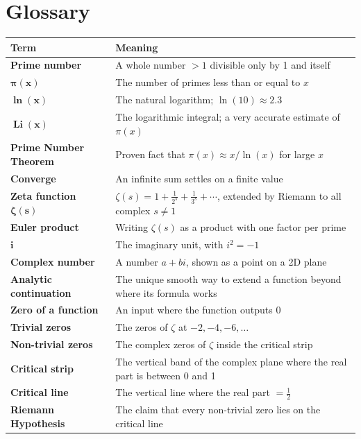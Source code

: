 \documentclass[11pt,a4paper]{article}
\newcommand{\Li}{\operatorname{Li}}
\begin{document}
\section{Glossary}

\begin{center}
\renewcommand{\arraystretch}{1.2}
\begin{tabularx}{\textwidth}{>{\bfseries}l X}
\toprule
\normalfont\textbf{Term} & \textbf{Meaning} \\
\midrule
Prime number & A whole number $>1$ divisible only by 1 and itself \\
$\boldsymbol{\pi(x)}$ & The number of primes less than or equal to $x$ \\
$\boldsymbol{\ln(x)}$ & The natural logarithm; $\ln(10) \approx 2.3$ \\
$\boldsymbol{\Li(x)}$ & The logarithmic integral; a very accurate estimate of $\pi(x)$ \\
Prime Number Theorem & Proven fact that $\pi(x) \approx x/\ln(x)$ for large $x$ \\
Converge & An infinite sum settles on a finite value \\
Zeta function $\boldsymbol{\zeta(s)}$ & $\zeta(s) = 1 + \frac1{2^s} + \frac1{3^s} + \cdots$, extended by Riemann to all complex $s \ne 1$ \\
Euler product & Writing $\zeta(s)$ as a product with one factor per prime \\
$\boldsymbol{i}$ & The imaginary unit, with $i^2 = -1$ \\
Complex number & A number $a + bi$, shown as a point on a 2D plane \\
Analytic continuation & The unique smooth way to extend a function beyond where its formula works \\
Zero of a function & An input where the function outputs 0 \\
Trivial zeros & The zeros of $\zeta$ at $-2, -4, -6, \ldots$ \\
Non-trivial zeros & The complex zeros of $\zeta$ inside the critical strip \\
Critical strip & The vertical band of the complex plane where the real part is between 0 and 1 \\
Critical line & The vertical line where the real part $= \frac12$ \\
Riemann Hypothesis & The claim that every non-trivial zero lies on the critical line \\
\bottomrule
\end{tabularx}
\end{center}
\end{document}
